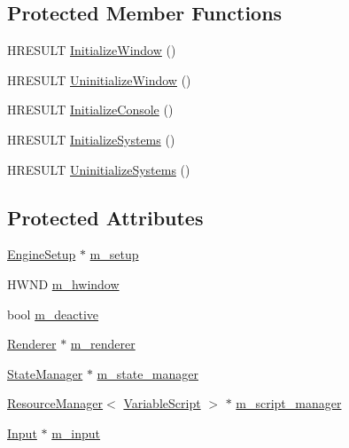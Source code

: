 \subsection*{Protected Member Functions}
\begin{DoxyCompactItemize}
\item 
H\+R\+E\+S\+U\+LT \hyperlink{classmage_1_1_engine_afdc1cf0de7880cdcfe766d12e56bc0e3}{Initialize\+Window} ()
\item 
H\+R\+E\+S\+U\+LT \hyperlink{classmage_1_1_engine_a52544e3bdc0e62f5beab19e9c37ec022}{Uninitialize\+Window} ()
\item 
H\+R\+E\+S\+U\+LT \hyperlink{classmage_1_1_engine_a82b2a8f29e537072ede0f2b032f49ded}{Initialize\+Console} ()
\item 
H\+R\+E\+S\+U\+LT \hyperlink{classmage_1_1_engine_aa691369008f234bfe88bbe0b25f1155e}{Initialize\+Systems} ()
\item 
H\+R\+E\+S\+U\+LT \hyperlink{classmage_1_1_engine_ad760164f873e1d15aa8826d532b6d551}{Uninitialize\+Systems} ()
\end{DoxyCompactItemize}
\subsection*{Protected Attributes}
\begin{DoxyCompactItemize}
\item 
\hyperlink{structmage_1_1_engine_setup}{Engine\+Setup} $\ast$ \hyperlink{classmage_1_1_engine_a825715684015ac2a43cfc5b6bf3b083f}{m\+\_\+setup}
\item 
H\+W\+ND \hyperlink{classmage_1_1_engine_a1dda09f0ed656180f926616a0d3f95f1}{m\+\_\+hwindow}
\item 
bool \hyperlink{classmage_1_1_engine_ab8a4b0157403708ae7d1d018a95b4c63}{m\+\_\+deactive}
\item 
\hyperlink{classmage_1_1_renderer}{Renderer} $\ast$ \hyperlink{classmage_1_1_engine_ad2107f910b4471ee3d3934588c6d36c3}{m\+\_\+renderer}
\item 
\hyperlink{classmage_1_1_state_manager}{State\+Manager} $\ast$ \hyperlink{classmage_1_1_engine_a7a0c463c67c3375b896809be9046113d}{m\+\_\+state\+\_\+manager}
\item 
\hyperlink{classmage_1_1_resource_manager}{Resource\+Manager}$<$ \hyperlink{classmage_1_1_variable_script}{Variable\+Script} $>$ $\ast$ \hyperlink{classmage_1_1_engine_a4faf1b8f94a84be27dd63054bf6fe36d}{m\+\_\+script\+\_\+manager}
\item 
\hyperlink{classmage_1_1_input}{Input} $\ast$ \hyperlink{classmage_1_1_engine_a432ac639c593fd0fb8cede2463fe10c2}{m\+\_\+input}
\end{DoxyCompactItemize}
